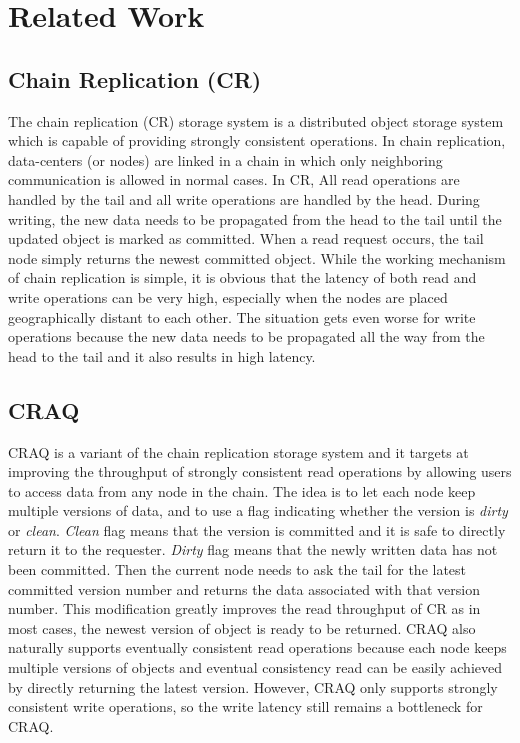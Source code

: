 \section{Related Work}

\subsection{Chain Replication (CR)}
The chain replication (CR) storage system is a distributed object storage system which is capable of providing strongly consistent operations. In chain replication, data-centers (or nodes) are linked in a chain in which only neighboring communication is allowed in normal cases. In CR, All read operations are handled by the tail and all write operations are handled by the head. During writing, the new data needs to be propagated from the head to the tail until the updated object is marked as committed. When a read request occurs, the tail node simply returns the newest committed object. While the working mechanism of chain replication is simple, it is obvious that the latency of both read and write operations can be very high, especially when the nodes are placed geographically distant to each other. The situation gets even worse for write operations because the new data needs to be propagated all the way from the head to the tail and it also results in high latency.

\subsection{CRAQ}
CRAQ\cite{terrace2009object} is a variant of the chain replication storage system and it targets at improving the throughput of strongly consistent read operations by allowing users to access data from any node in the chain. The idea is to let each node keep multiple versions of data, and to use a flag indicating whether the version is {\it dirty} or {\it clean}. {\it Clean} flag means that the version is committed and it is safe to directly return it to the requester. {\it Dirty} flag means that the newly written data has not been committed. Then the current node needs to ask the tail for the latest committed version number and returns the data associated with that version number. This modification greatly improves the read throughput of CR as in most cases, the newest version of object is ready to be returned. CRAQ also naturally supports eventually consistent read operations because each node keeps multiple versions of objects and eventual consistency read can be easily achieved by directly returning the latest version. However, CRAQ only supports strongly consistent write operations, so the write latency still remains a bottleneck for CRAQ.

